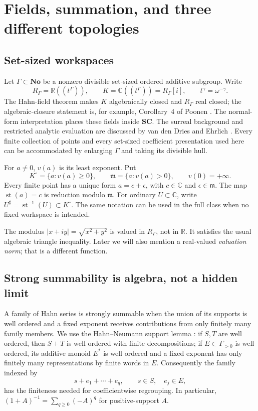 \documentclass[11pt,letterpaper]{article}
\theoremstyle{definition}
\theoremstyle{remark}
\newcommand{\No}{\mathbf{No}}\newcommand{\SC}{\mathbf{SC}}
\newcommand{\R}{\mathbb R}\newcommand{\C}{\mathbb C}\newcommand{\Q}{\mathbb Q}
\newcommand{\m}{\mathfrak m}\newcommand{\st}{\operatorname{st}}
\newcommand{\sh}{^{\sharp}}\newcommand{\dd}{\,d}
\numberwithin{equation}{section}
\begin{document}
\section{Fields, summation, and three different topologies}\label{sec:foundations}

\subsection{Set-sized workspaces}
Let $\Gamma\subset\No$ be a nonzero divisible set-sized ordered additive subgroup. Write
\begin{equation}\label{eq:fields}
 R_\Gamma=\R((t^\Gamma)),\qquad K=\C((t^\Gamma))=R_\Gamma[i],\qquad
 t^\gamma=\omega^{-\gamma}.
\end{equation}
The Hahn-field theorem makes $K$ algebraically closed and $R_\Gamma$ real closed; the algebraic-closure statement is, for example, Corollary~4 of Poonen \cite{Poonen}. The normal-form interpretation places these fields inside $\SC$. The surreal background and restricted analytic evaluation are discussed by van den Dries and Ehrlich \cite{vdDE}. Every finite collection of points and every set-sized coefficient presentation used here can be accommodated by enlarging $\Gamma$ and taking its divisible hull.

For $a\ne0$, $v(a)$ is its least exponent. Put
\[
 K^\circ=\{a:v(a)\ge0\},\qquad \m=\{a:v(a)>0\},\qquad v(0)=+\infty.
\]
Every finite point has a unique form $a=c+\epsilon$, with $c\in\C$ and $\epsilon\in\m$. The map $\st(a)=c$ is reduction modulo $\m$. For ordinary $U\subset\C$, write $U\sh=\st^{-1}(U)\subset K^\circ$. The same notation can be used in the full class when no fixed workspace is intended.

The modulus $|x+iy|=\sqrt{x^2+y^2}$ is valued in $R_\Gamma$, not in $\R$. It satisfies the usual algebraic triangle inequality. Later we will also mention a real-valued \emph{valuation norm}; that is a different function.

\subsection{Strong summability is algebra, not a hidden limit}
A family of Hahn series is strongly summable when the union of its supports is well ordered and a fixed exponent receives contributions from only finitely many family members. We use the Hahn--Neumann support lemma \cite{Neumann,Poonen}: if $S,T$ are well ordered, then $S+T$ is well ordered with finite decompositions; if $E\subset\Gamma_{>0}$ is well ordered, its additive monoid $E^*$ is well ordered and a fixed exponent has only finitely many representations by finite words in $E$. Consequently the family indexed by
\[
 s+e_1+\cdots+e_q,\qquad s\in S,\quad e_j\in E,
\]
has the finiteness needed for coefficientwise regrouping. In particular, $(1+A)^{-1}=\sum_{q\ge0}(-A)^q$ for positive-support $A$.
\end{document}
